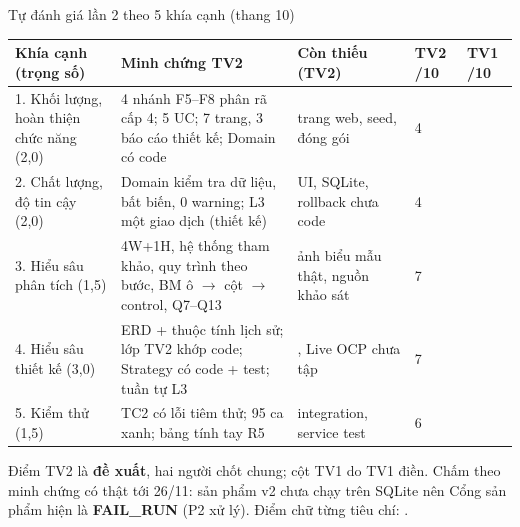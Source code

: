 \begin{frame}{Tự đánh giá lần 2 theo 5 khía cạnh (thang 10) \TC}
\scriptsize
\begin{tabularx}{\textwidth}{@{}L{2.7cm}YL{2.9cm}C{1.05cm}C{1.05cm}@{}}
\toprule
\textbf{Khía cạnh (trọng số)} & \textbf{Minh chứng TV2} & \textbf{Còn thiếu (TV2)} & \textbf{TV2 /10} & \textbf{TV1 /10} \\
. Khối lượng, hoàn thiện chức năng (2,0) & 4 nhánh F5--F8 phân rã cấp 4; 5 UC; 7 trang, 3 báo cáo thiết kế; Domain có code & trang web, seed, đóng gói & 4 & \\
2. Chất lượng, độ tin cậy (2,0) & Domain kiểm tra dữ liệu, bất biến, 0 warning; L3 một giao dịch (thiết kế) & UI, SQLite, rollback chưa code & 4 & \\
3. Hiểu sâu phân tích (1,5) & 4W+1H, hệ thống tham khảo, quy trình theo bước, BM ô $\to$ cột $\to$ control, Q7--Q13 & ảnh biểu mẫu thật, nguồn khảo sát & 7 & \\
4. Hiểu sâu thiết kế (3,0) & ERD + thuộc tính lịch sử; lớp TV2 khớp code; Strategy có code + test; tuần tự L3 & , Live OCP chưa tập & 7 & \\
5. Kiểm thử (1,5) & TC2 có lỗi tiêm thử; 95 ca xanh; bảng tính tay R5 & integration, service test & 6 & \\
\bottomrule
\end{tabularx}

\vspace{2mm}
{\tiny Điểm TV2 là \textbf{đề xuất}, hai người chốt chung; cột TV1 do TV1 điền. Chấm theo minh chứng có thật tới 26/11: sản phẩm v2 chưa chạy trên SQLite nên Cổng sản phẩm hiện là \textbf{FAIL\_RUN} (P2 xử lý). Điểm chữ từng tiêu chí: .\par}
\end{frame}


